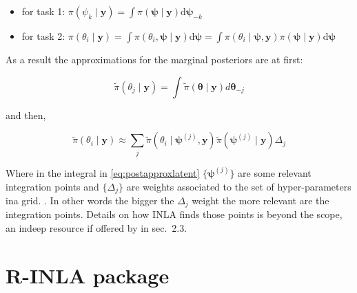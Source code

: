 \documentclass[
  12pt,
  a4paper,
  oneside]{book}
\providecommand{\tightlist}{%
  \setlength{\itemsep}{0pt}\setlength{\parskip}{0pt}}
\theoremstyle{definition}
\theoremstyle{definition}
\theoremstyle{definition}
\theoremstyle{remark}
\begin{document}
\begin{itemize}
\tightlist
\item
  for task 1: \(\pi\left(\psi_{k} \mid \boldsymbol{\mathbf{y}}\right)=\int \pi(\boldsymbol{\psi} \mid \boldsymbol{\mathbf{y}}) \mathrm{d} \boldsymbol{\psi}_{-k}\)
\item
  for task 2: \(\pi\left(\theta_{i} \mid \boldsymbol{\mathbf{y}}\right)=\int \pi\left(\theta_{i}, \boldsymbol{\psi} \mid \boldsymbol{\mathbf{y}}\right) \mathrm{d} \boldsymbol{\psi}=\int \pi\left(\theta_{i} \mid \boldsymbol{\psi}, \boldsymbol{\mathbf{y}}\right) \pi(\boldsymbol{\psi} \mid \boldsymbol{\mathbf{y}}) \mathrm{d} \boldsymbol{\psi}\)
\end{itemize}

As a result the approximations for the marginal posteriors are at first:

\begin{equation}
\tilde{\pi}\left(\theta_{j} \mid \boldsymbol{\mathbf{y}}\right)=\int \tilde{\pi}(\boldsymbol{\theta} \mid \boldsymbol{\mathbf{y}}) d \boldsymbol{\theta}_{-j}
\label{eq:postapproxprior}
\end{equation}

and then,

\begin{equation}
\tilde{\pi}\left(\theta_{i} \mid \boldsymbol{\mathbf{y}}\right) \approx \sum_{j} \tilde{\pi}\left(\theta_{i} \mid \boldsymbol{\psi}^{(j)}, \boldsymbol{\mathbf{y}}\right) \tilde{\pi}\left(\boldsymbol{\psi}^{(j)} \mid \boldsymbol{\mathbf{y}}\right) \Delta_{j}
\label{eq:postapproxlatent}
\end{equation}

Where in the integral in \eqref{eq:postapproxlatent} \(\{\boldsymbol{\psi}^{(j)}\}\) are some relevant integration points and \(\{\Delta_j\}\) are weights associated to the set of hyper-parameters ina grid. \citep{Blangiardo-Cameletti}.
In other words the bigger the \(\Delta_{j}\) weight the more relevant are the integration points. Details on how INLA finds those points is beyond the scope, an indeep resource if offered by \citet{wang2018bayesian} in sec.~2.3.

\hypertarget{rinla}{%
\section{R-INLA package}\label{rinla}}
\end{document}
